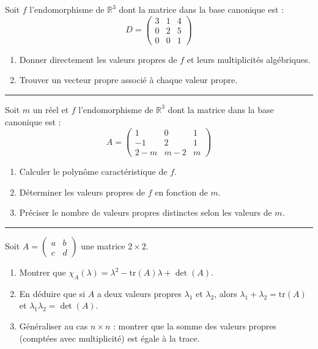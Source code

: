 \documentclass[../PolyS4.tex]{subfiles}
\begin{document}

Soit $f$ l'endomorphisme de $\mathbb{R}^3$ dont la matrice dans la base canonique est :
$$D = \begin{pmatrix}
3 & 1 & 4 \\
0 & 2 & 5 \\
0 & 0 & 1
\end{pmatrix}$$
\begin{enumerate}
    \item Donner directement les valeurs propres de $f$ et leurs multiplicités algébriques.
    \item Trouver un vecteur propre associé à chaque valeur propre.
\end{enumerate}

\vspace{1em}
\hrule
\vspace{1em}


Soit $m$ un réel et $f$ l'endomorphisme de $\mathbb{R}^3$ dont la matrice dans la base canonique est :
$$A = \begin{pmatrix}
1 & 0 & 1 \\
-1 & 2 & 1 \\
2-m & m-2 & m
\end{pmatrix}$$
\begin{enumerate}
    \item Calculer le polynôme caractéristique de $f$.
    \item Déterminer les valeurs propres de $f$ en fonction de $m$.
    \item Préciser le nombre de valeurs propres distinctes selon les valeurs de $m$.
\end{enumerate}

\vspace{1em}
\hrule
\vspace{1em}


Soit $A = \begin{pmatrix}
a & b \\
c & d
\end{pmatrix}$ une matrice $2 \times 2$.
\begin{enumerate}
    \item Montrer que $\chi_A(\lambda) = \lambda^2 - \mathrm{tr}(A)\lambda + \det(A)$.
    \item En déduire que si $A$ a deux valeurs propres $\lambda_1$ et $\lambda_2$, alors $\lambda_1 + \lambda_2 = \mathrm{tr}(A)$ et $\lambda_1 \lambda_2 = \det(A)$.
    \item Généraliser au cas $n \times n$ : montrer que la somme des valeurs propres (comptées avec multiplicité) est égale à la trace.
\end{enumerate}
\end{document}
